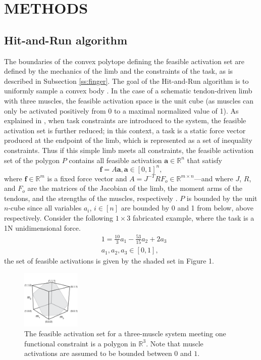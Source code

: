 \section{METHODS}

\subsection{Hit-and-Run algorithm}
The boundaries of the convex polytope defining the feasible activation set are defined by the mechanics of the limb and the constraints of the task, as is described in Subsection \ref{ss:finger}. The goal of the Hit-and-Run algorithm is to uniformly sample a convex body \cite{smith1984efficient}. 
In the case of a schematic tendon-driven limb with three muscles, the feasible activation space is the unit cube (as muscles can only be activated positively from 0 to a maximal normalized value of 1). As explained in \cite{Valero-Cuevas2009mathematical}, when task constraints are introduced to the system, the feasible activation set is further reduced; in this context, a task is a static force vector produced at the endpoint of the limb, which is represented as a set of inequality constraints. Thus if this simple limb meets all constraints, the feasible activation set of the polygon $P$ contains all feasible activation  $\textbf{a} \in \mathbb{R}^n$ that satisfy
\[\textbf{f} = A\textbf{a}, \textbf{a} \in [0,1]^n,\]
where $\textbf{f} \in \mathbb{R}^m$ is a fixed force vector and $A = J^{-T}RF_o \in \mathbb{R}^{m \times n}$---and where $J$, $R$, and $F_o$ are the matrices of the Jacobian of the limb, the moment arms of the tendons, and the strengths of the muscles, respectively \cite{Valero-Cuevas1998Large,Valero-Cuevas2009mathematical}. $P$ is bounded by the unit $n$-cube since all variables $a_i$, $i \in [n]$ are bounded by 0 and 1 from below, above respectively.
Consider the following $1 \times 3$ fabricated example, where the task is a 1N unidimensional force.
\begin{align*}
&1 = \frac{10}{3}a_1 - \frac{53}{15}a_2 + 2a_3 \\
&a_1, a_2, a_3 \in [0,1],
\end{align*}
the set of feasible activations is given by the shaded set in Figure 1.

\begin{figure}[ht]
  \label{fig:fig_hr}
   \begin{center}
    \includegraphics[width=0.25\textwidth]{sections/figs/feasibleactivation.png}
  \end{center}
  \caption{The feasible activation set for a  three-muscle system meeting one functional constraint is a polygon in $\mathbb{R}^3$. Note that muscle activations are assumed to be bounded between $0$ and $1$.}

\end{figure}

